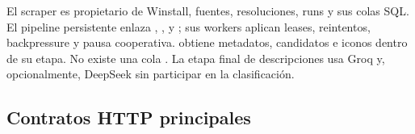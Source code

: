El scraper es propietario de Winstall, fuentes, resoluciones, runs y sus colas SQL. El pipeline persistente enlaza , ,  y ; sus workers aplican leases, reintentos, backpressure y pausa cooperativa.  obtiene metadatos, candidatos e iconos dentro de su etapa. No existe una cola . La etapa final de descripciones usa Groq y, opcionalmente, DeepSeek sin participar en la clasificación.


\subsection{Contratos HTTP principales}

